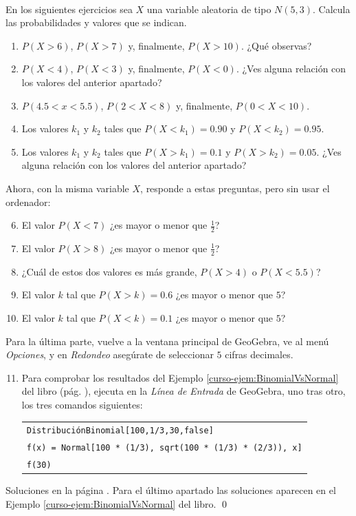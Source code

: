 \documentclass[10pt,a4paper]{article}\usepackage[]{graphicx}\usepackage[]{color}
\begin{document}
\begin{ejercicio}
\label{tut05:ejercicio21}
\quad\\
En los siguientes ejercicios sea $X$ una variable aleatoria de tipo $N(5, 3)$. Calcula las probabilidades y valores que se indican.
\begin{enumerate}
  \item $P(X > 6)$, $P(X > 7)$ y, finalmente, $P(X > 10)$. ¿Qué observas?
  \item $P(X < 4)$, $P(X < 3)$ y, finalmente, $P(X < 0)$. ¿Ves alguna relación con los valores del anterior apartado?
  \item $P(4.5 < x < 5.5)$, $P(2 < X < 8)$ y, finalmente, $P( 0 < X < 10)$.
  \item Los valores $k_1$ y $k_2$ tales que $P(X < k_1) = 0.90$ y $P(X < k_2) = 0.95$.
  \item Los valores $k_1$ y $k_2$ tales que $P(X > k_1) = 0.1$ y $P(X > k_2) = 0.05$. ¿Ves alguna relación con los valores del anterior apartado?
\end{enumerate}
Ahora, con la misma variable $X$, responde a estas preguntas, pero sin usar el ordenador:
\begin{enumerate}
  \setcounter{enumi}{5}
  \item El valor $P(X < 7)$ ¿es mayor o menor que $\frac{1}{2}$?
  \item El valor $P(X > 8)$ ¿es mayor o menor que $\frac{1}{2}$?
  \item ¿Cuál de estos dos valores es más grande, $P(X > 4)$ o $P(X < 5.5)$?
  \item El valor $k$ tal que $P(X > k) = 0.6$ ¿es mayor o menor que $5$?
  \item El valor $k$ tal que $P(X < k) = 0.1$ ¿es mayor o menor que $5$?
\end{enumerate}
Para la última parte, vuelve a la ventana principal de GeoGebra, ve al menú {\em Opciones}, y en {\em Redondeo} asegúrate de seleccionar $5$ cifras decimales.
\begin{enumerate}
  \setcounter{enumi}{10}
  \item Para comprobar los resultados del Ejemplo \ref{curso-ejem:BinomialVsNormal} del libro (pág. \pageref{curso-ejem:BinomialVsNormal}), ejecuta en la {\em Línea de Entrada} de GeoGebra, uno tras otro, los tres comandos siguientes:
      \begin{center}
      \begin{tabular}{l}
        {\tt DistribuciónBinomial[100,1/3,30,false]}\\
        {\tt f(x) = Normal[100 * (1/3), sqrt(100 * (1/3) * (2/3)), x]}\\
        {\tt f(30)}
      \end{tabular}
      \end{center}
\end{enumerate}
Soluciones en la página \pageref{tut05:ejercicio21:sol}. Para el último apartado las soluciones aparecen en el Ejemplo \ref{curso-ejem:BinomialVsNormal} del libro. \qed
\end{ejercicio}
\end{document}
